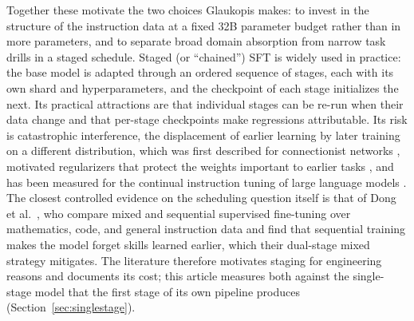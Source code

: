 \documentclass[twocolumn]{svjour3}
\begin{document}
Together these motivate the two choices Glaukopis makes: to invest in the structure of the instruction data at a fixed 32B parameter budget rather than in more parameters, and to separate broad domain absorption from narrow task drills in a staged schedule. Staged (or ``chained'') SFT is widely used in practice: the base model is adapted through an ordered sequence of stages, each with its own shard and hyperparameters, and the checkpoint of each stage initializes the next. Its practical attractions are that individual stages can be re-run when their data change and that per-stage checkpoints make regressions attributable. Its risk is catastrophic interference, the displacement of earlier learning by later training on a different distribution, which was first described for connectionist networks \cite{mccloskey1989catastrophic}, motivated regularizers that protect the weights important to earlier tasks \cite{kirkpatrick2017ewc}, and has been measured for the continual instruction tuning of large language models \cite{luo2023forgetting}. The closest controlled evidence on the scheduling question itself is that of Dong et al.~\cite{dong2024composition}, who compare mixed and sequential supervised fine-tuning over mathematics, code, and general instruction data and find that sequential training makes the model forget skills learned earlier, which their dual-stage mixed strategy mitigates. The literature therefore motivates staging for engineering reasons and documents its cost; this article measures both against the single-stage model that the first stage of its own pipeline produces (Section~\ref{sec:singlestage}).
\end{document}
